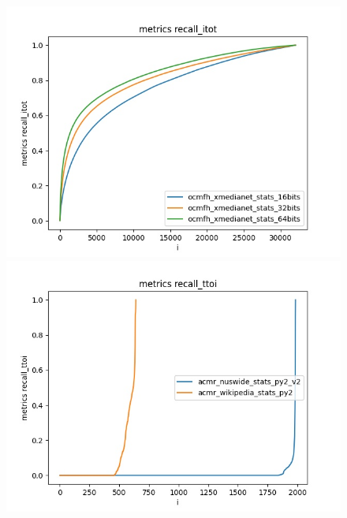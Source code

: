 \begin{figure}[H]
\begin{minipage}[!h]{0.5\linewidth}
            \end{minipage}
            \begin{minipage}[!h]{0.5\linewidth}
                \centering
                \includegraphics[width=\linewidth]{resultsImages/recall/metrics recall_itot_ocmfh_xmedia.jpeg}
            \end{minipage}
            \begin{minipage}[!h]{0.5\linewidth}
                \centering
                \includegraphics[width=\linewidth]{resultsImages/recall/metrics recall_ttoi_acmr_both.jpeg}
            \end{minipage}
            

\end{figure}
